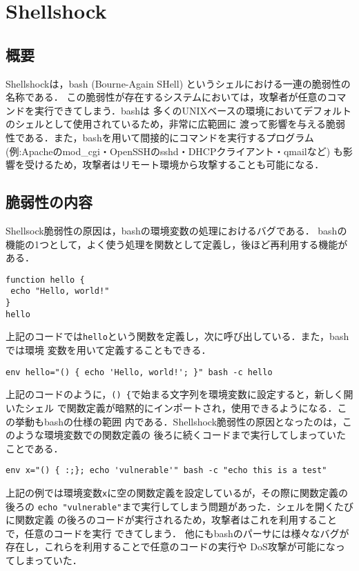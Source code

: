 \section{Shellshock}

\subsection{概要}

Shellshockは，bash (Bourne-Again SHell)
というシェルにおける一連の脆弱性の名称である．\cite{uscert}
この脆弱性が存在するシステムにおいては，攻撃者が任意のコマンドを実行できてしまう．bashは
多くのUNIXベースの環境においてデフォルトのシェルとして使用されているため，非常に広範囲に
渡って影響を与える脆弱性である．また，bashを用いて間接的にコマンドを実行するプログラム
(例:Apacheのmod\_cgi・OpenSSHのsshd・DHCPクライアント・qmailなど)
も影響を受けるため，攻撃者はリモート環境から攻撃することも可能になる．

\subsection{脆弱性の内容}

Shellsock脆弱性の原因は，bashの環境変数の処理におけるバグである．\cite{cve20146271}
bashの機能の1つとして，よく使う処理を関数として定義し，後ほど再利用する機能がある．

\begin{verbatim}
function hello {
 echo "Hello, world!"
}
hello
\end{verbatim}

上記のコードでは\texttt{hello}という関数を定義し，次に呼び出している．また，bashでは環境
変数を用いて定義することもできる．

\begin{verbatim}
env hello="() { echo 'Hello, world!'; }" bash -c hello
\end{verbatim}

上記のコードのように，\texttt{() \{}で始まる文字列を環境変数に設定すると，新しく開いたシェル
で関数定義が暗黙的にインポートされ，使用できるようになる．この挙動もbashの仕様の範囲
内である．Shellshock脆弱性の原因となったのは，このような環境変数での関数定義の
後ろに続くコードまで実行してしまっていたことである．

\begin{verbatim}
env x="() { :;}; echo 'vulnerable'" bash -c "echo this is a test"
\end{verbatim}

上記の例では環境変数\texttt{x}に空の関数定義を設定しているが，その際に関数定義の後ろの
\texttt{echo "vulnerable"}まで実行してしまう問題があった．シェルを開くたびに関数定義
の後ろのコードが実行されるため，攻撃者はこれを利用することで，任意のコードを実行
できてしまう．
他にもbashのパーサには様々なバグが存在し，これらを利用することで任意のコードの実行や
DoS攻撃が可能になってしまっていた．\cite{cve20147169, cve20147186, cve20147187, cve20146277, cve20146278}

